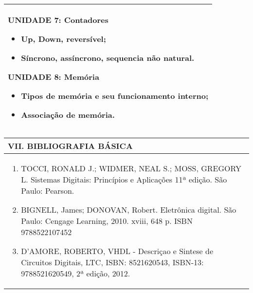 \documentclass[12pt]{article}
\begin{document}
\begin{longtable}{|L{1.025\textwidth}|}
UNIDADE 7: Contadores
\begin{itemize}
    \item  Up, Down, reversível;
    \item  Síncrono, assíncrono, sequencia não natural.
\end{itemize}

UNIDADE 8: Memória 
\begin{itemize}
    \item Tipos de memória e seu funcionamento interno;
    \item Associação de memória.
\end{itemize}
\\ \hline
\end{longtable} 




\begin{longtable}{|L{1.025\textwidth}|} \hline
%
{\bf VII. BIBLIOGRAFIA BÁSICA} \\ \hline
\begin{enumerate}
%
\item TOCCI, RONALD J.; WIDMER, NEAL S.; MOSS, GREGORY L. Sistemas Digitais: Princípios e Aplicações 11ª edição. São Paulo: Pearson. 
\item  BIGNELL, James; DONOVAN, Robert. Eletrônica digital. São Paulo: Cengage Learning, 2010. xviii, 648 p. ISBN 9788522107452
%
\item D'AMORE, ROBERTO, VHDL - Descriçao e Sintese de Circuitos Digitais, LTC, ISBN: 8521620543, ISBN-13: 9788521620549, 2ª edição, 2012.

\end{enumerate}
 \\ \hline
\end{longtable}


\end{document}
